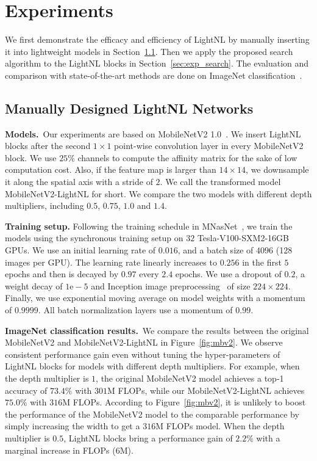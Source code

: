 \documentclass[10pt,twocolumn,letterpaper]{article}
\begin{document}
\section{Experiments} \label{sec:exp}
We first demonstrate the efficacy and efficiency of LightNL by manually inserting it into lightweight models in Section~\ref{sec:exp_lsam}. Then we apply the proposed search algorithm to the LightNL blocks in Section~\ref{sec:exp_search}. The evaluation and comparison with state-of-the-art methods are done on ImageNet classification~\cite{deng2009imagenet}.

\subsection{Manually Designed LightNL Networks}\label{sec:exp_lsam}
\noindent\textbf{Models.}~Our experiments are based on MobileNetV2 1.0~\cite{sandler2018mobilenetv2}. We insert LightNL blocks after the second $1\times1$ point-wise convolution layer in every MobileNetV2 block. We use $25\%$ channels to compute the affinity matrix for the sake of low computation cost. Also, if the feature map is larger than $14 \times 14$, we downsample it along the spatial axis with a stride of $2$. We call the transformed model MobileNetV2-LightNL for short. We compare the two models with different depth multipliers, including $0.5$, $0.75$, $1.0$ and $1.4$. 

\vspace{0.5ex}\noindent\textbf{Training setup.}
Following the training schedule in MNasNet~\cite{tan2019mnasnet}, we train the models using the synchronous training setup on $32$ Tesla-V100-SXM2-16GB GPUs. We use an initial learning rate of $0.016$, and a batch size of $4096$ (128 images per GPU). The learning rate linearly increases to $0.256$ in the first $5$ epochs and then is decayed by $0.97$ every $2.4$ epochs. We use a dropout of $0.2$, a weight decay of $1\mathrm{e-}5$ and Inception image preprocessing~\cite{szegedy2017inception} of size $224 \times 224$. Finally, we use exponential moving average on model weights with a momentum of $0.9999$. All batch normalization layers use a momentum of $0.99$.

\vspace{0.5ex}\noindent\textbf{ImageNet classification results.}~We compare the results between the original MobileNetV2 and MobileNetV2-LightNL in Figure~\ref{fig:mbv2}. We observe consistent performance gain even without tuning the hyper-parameters of LightNL blocks for models with different depth multipliers. For example, when the depth multiplier is $1$, the original MobileNetV2 model achieves a top-1 accuracy of $73.4\%$ with $301$M FLOPs, while our MobileNetV2-LightNL achieves $75.0\%$ with $316$M FLOPs. According to Figure~\ref{fig:mbv2}, it is unlikely to boost the performance of the MobileNetV2 model to the comparable performance by simply increasing the width to get a $316$M FLOPs model.
When the depth multiplier is $0.5$, LightNL blocks bring a performance gain of $2.2\%$ with a marginal increase in FLOPs ($6$M).
\end{document}
